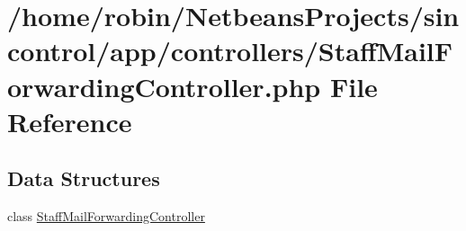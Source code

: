 \hypertarget{_staff_mail_forwarding_controller_8php}{}\section{/home/robin/\+Netbeans\+Projects/sincontrol/app/controllers/\+Staff\+Mail\+Forwarding\+Controller.php File Reference}
\label{_staff_mail_forwarding_controller_8php}
\subsection*{Data Structures}
\begin{DoxyCompactItemize}
\item 
class \hyperlink{class_staff_mail_forwarding_controller}{Staff\+Mail\+Forwarding\+Controller}
\end{DoxyCompactItemize}
